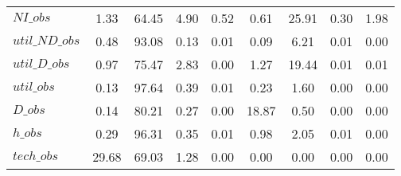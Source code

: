 \begin{center}
\begin{longtable}{lcccccccc}
$NI\_obs        $	 & 	         1.33	 & 	        64.45	 & 	         4.90	 & 	         0.52	 & 	         0.61	 & 	        25.91	 & 	         0.30	 & 	         1.98 \\ 
$util\_ND\_obs  $	 & 	         0.48	 & 	        93.08	 & 	         0.13	 & 	         0.01	 & 	         0.09	 & 	         6.21	 & 	         0.01	 & 	         0.00 \\ 
$util\_D\_obs   $	 & 	         0.97	 & 	        75.47	 & 	         2.83	 & 	         0.00	 & 	         1.27	 & 	        19.44	 & 	         0.01	 & 	         0.01 \\ 
$util\_obs      $	 & 	         0.13	 & 	        97.64	 & 	         0.39	 & 	         0.01	 & 	         0.23	 & 	         1.60	 & 	         0.00	 & 	         0.00 \\ 
$D\_obs         $	 & 	         0.14	 & 	        80.21	 & 	         0.27	 & 	         0.00	 & 	        18.87	 & 	         0.50	 & 	         0.00	 & 	         0.00 \\ 
$h\_obs         $	 & 	         0.29	 & 	        96.31	 & 	         0.35	 & 	         0.01	 & 	         0.98	 & 	         2.05	 & 	         0.01	 & 	         0.00 \\ 
$tech\_obs      $	 & 	        29.68	 & 	        69.03	 & 	         1.28	 & 	         0.00	 & 	         0.00	 & 	         0.00	 & 	         0.00	 & 	         0.00 \\ 
\end{longtable}
 \end{center}
